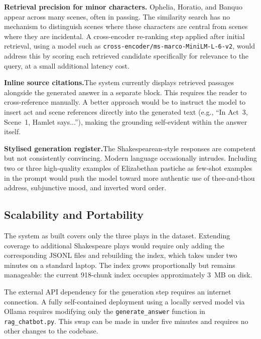 \documentclass[10pt,conference]{IEEEtran}
\begin{document}
\noindent\textbf{Retrieval precision for minor characters.}\enspace
Ophelia, Horatio, and Banquo appear across many scenes, often in
passing. The similarity search has no mechanism to distinguish scenes
where these characters are central from scenes where they are
incidental. A cross-encoder re-ranking step applied after initial
retrieval, using a model such as
\texttt{cross-encoder/ms-marco-MiniLM-L-6-v2}, would address this
by scoring each retrieved candidate specifically for relevance to
the query, at a small additional latency cost.

\medskip\noindent\textbf{Inline source citations.}\enspace The system
currently displays retrieved passages alongside the generated answer
in a separate block. This requires the reader to cross-reference
manually. A better approach would be to instruct the model to insert
act and scene references directly into the generated text (e.g.,
``In Act~3, Scene~1, Hamlet says...''), making the grounding
self-evident within the answer itself.

\medskip\noindent\textbf{Stylised generation register.}\enspace The
Shakespearean-style responses are competent but not consistently
convincing. Modern language occasionally intrudes. Including two or
three high-quality examples of Elizabethan pastiche as few-shot
examples in the prompt would push the model toward more authentic use
of thee-and-thou address, subjunctive mood, and inverted word order.

\subsection{Scalability and Portability}

The system as built covers only the three plays in the dataset.
Extending coverage to additional Shakespeare plays would require only
adding the corresponding JSONL files and rebuilding the index, which
takes under two minutes on a standard laptop. The index grows
proportionally but remains manageable: the current 918-chunk index
occupies approximately 3~MB on disk.

The external API dependency for the generation step requires an
internet connection. A fully self-contained deployment using a locally
served model via Ollama requires modifying only the
\texttt{generate\_answer} function in \texttt{rag\_chatbot.py}. This
swap can be made in under five minutes and requires no other changes
to the codebase.

\end{document}
